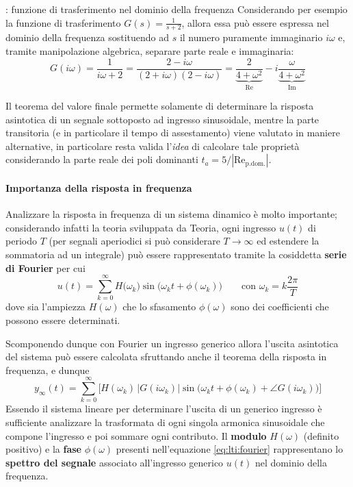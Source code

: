 		\begin{esempio}{: funzione di trasferimento nel dominio della frequenza}
			Considerando per esempio la funzione di trasferimento $G(s) = \frac 1 {s+2}$, allora essa può essere espressa nel dominio della frequenza sostituendo ad $s$ il numero puramente immaginario $i\omega$ e, tramite manipolazione algebrica, separare parte reale e immaginaria:
			\[ G(i\omega) = \frac 1 {i\omega + 2} = \frac{2-i\omega}{(2+i\omega)(2-i\omega)} = \underbrace{\frac{2}{4+\omega^2}}_\textrm{Re} - i \underbrace{\frac \omega {4+\omega^2}}_\textrm{Im} \]
		\end{esempio}
		
		\vspace{3mm}
		
		Il teorema del valore finale permette solamente di determinare la risposta asintotica di un segnale sottoposto ad ingresso sinusoidale, mentre la parte transitoria (e in particolare il tempo di assestamento) viene valutato in maniere alternative, in particolare resta valida l'\textit{idea} di calcolare tale proprietà considerando la parte reale dei poli dominanti $t_a =  5 /\left|\textrm{Re}_\textrm{p.dom.}\right|$.
		
		\paragraph{Importanza della risposta in frequenza} Analizzare la risposta in frequenza di un sistema dinamico è molto importante; considerando infatti la teoria sviluppata da Teoria, ogni ingresso $u(t)$ di periodo $T$ (per segnali aperiodici si può considerare $T\rightarrow \infty$ ed estendere la sommatoria ad un integrale) può essere rappresentato tramite la cosiddetta \textbf{serie di Fourier} per cui
		\[ u(t) = \sum_{k=0}^\infty H\big(\omega_k\big) \sin\big(\omega_k t + \phi(\omega_k)\big) \qquad \textrm{con } \omega_k = k \frac{2\pi}{T} \]
		dove sia l'ampiezza $H(\omega)$ che lo sfasamento $\phi(\omega)$ sono dei coefficienti che possono essere determinati.
		
		Scomponendo dunque con Fourier un ingresso generico allora l'uscita asintotica del sistema può essere calcolata sfruttando anche il teorema della risposta in frequenza, e dunque
		\begin{equation} \label{eq:lti:fourier}
			y_\infty(t) = \sum_{k=0}^\infty \Big[ H(\omega_k) \, \big|G(i\omega_k)\big| \sin\Big(\omega_kt + \phi(\omega_k) + \angle G(i\omega_k)\Big) \Big]
		\end{equation}
		Essendo il sistema lineare per determinare l'uscita di un generico ingresso è sufficiente analizzare la trasformata di ogni singola armonica sinusoidale che compone l'ingresso e poi sommare ogni contributo. Il \textbf{modulo} $H(\omega)$ (definito positivo) e la \textbf{fase} $\phi(\omega)$ presenti nell'equazione \ref{eq:lti:fourier} rappresentano lo \textbf{spettro del segnale} associato all'ingresso generico $u(t)$ nel dominio della frequenza.
			
